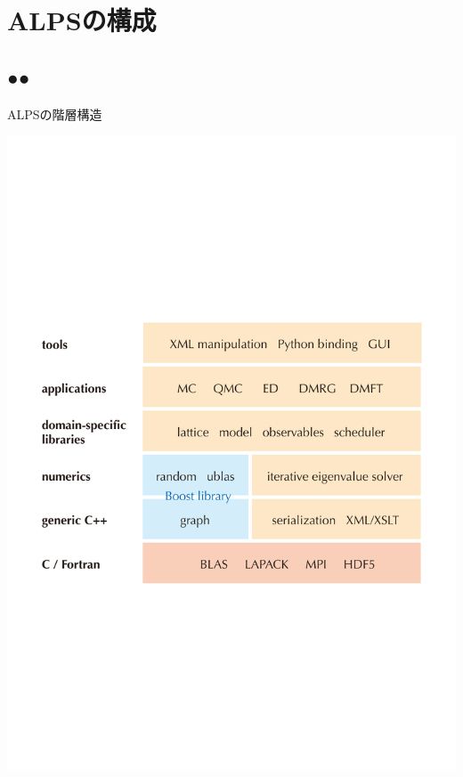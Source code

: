 \section{ALPSの構成}
\subsection*{{\protect\color{red}●}{\protect\color{blue}●}}

\begin{frame}{ALPSの階層構造}
  \begin{center}
    \includegraphics[height=0.65\textheight]{hierarchy.pdf}
  \end{center}
\end{frame}

